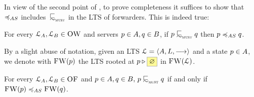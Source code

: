
\renewcommand{\serverA}{p}
\renewcommand{\serverB}{q}



In view of the second point of ,
to prove completeness it suffices to show that~$\asleq$
includes~$\testleqS$ in the LTS of
forwarders. This is indeed true:
\begin{lemma}
  \label{lem:completenessA}
  For every $\mathcal{L}_A, \mathcal{L}_B \in \textsc{OW}$ and
  servers $\serverA \in \StatesA, \serverB \in \StatesB $,
  if ${ \serverA } \testleqS { \serverB }$
  then ${ \serverA } \asleq { \serverB }$.
\end{lemma}


By a slight abuse of notation,
given an LTS $\mathcal{L} = \langle A, L, \mathrel{\overset{}\longrightarrow} \rangle$ and a state
$p \in A$,
we denote with $\textsc{FW}(
  p )$ the LTS rooted at $\server \triangleright \mailbox{ \emptyMset }$ in $\textsc{FW}(\mathcal{L})$.


\begin{theorem}%
  \label{thm:testleqS-equals-bhvleq}
  \label{thm:testleqS-equals-accleq}
  \label{thm:testleqS-equals-asleq}
  For every $\mathcal{L}_A, \mathcal{L}_B \in \textsc{OF}$
  and $\serverA \in \States, \serverB \in \StatesB, \,
  \serverA \testleqS \serverB$ if and only if
  $\liftFW{\serverA} \asleq \liftFW{\serverB}$.
\end{theorem}

